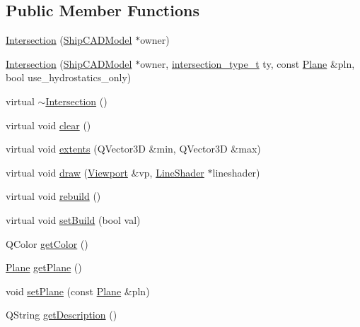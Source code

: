 \subsection*{Public Member Functions}
\begin{DoxyCompactItemize}
\item 
\hyperlink{classShipCAD_1_1Intersection_acde7d35483e1e4ee56ecf75eb7a70f66}{Intersection} (\hyperlink{classShipCAD_1_1ShipCADModel}{Ship\-C\-A\-D\-Model} $\ast$owner)
\item 
\hyperlink{classShipCAD_1_1Intersection_a3a4f17fe81289d26d2ec329dd9db5c69}{Intersection} (\hyperlink{classShipCAD_1_1ShipCADModel}{Ship\-C\-A\-D\-Model} $\ast$owner, \hyperlink{namespaceShipCAD_aa56834b730aafdf2786ddc9a60a046fd}{intersection\-\_\-type\-\_\-t} ty, const \hyperlink{classShipCAD_1_1Plane}{Plane} \&pln, bool use\-\_\-hydrostatics\-\_\-only)
\item 
virtual \hyperlink{classShipCAD_1_1Intersection_a064951a970ed8dd11081b2903ab62122}{$\sim$\-Intersection} ()
\item 
virtual void \hyperlink{classShipCAD_1_1Intersection_a2163245dc7153d1590811ab2902d6ee4}{clear} ()
\item 
virtual void \hyperlink{classShipCAD_1_1Intersection_af751d515708531ca098321840a92c47b}{extents} (Q\-Vector3\-D \&min, Q\-Vector3\-D \&max)
\item 
virtual void \hyperlink{classShipCAD_1_1Intersection_a9e346019a52aa0540628b75994ea94a5}{draw} (\hyperlink{classShipCAD_1_1Viewport}{Viewport} \&vp, \hyperlink{classShipCAD_1_1LineShader}{Line\-Shader} $\ast$lineshader)
\item 
virtual void \hyperlink{classShipCAD_1_1Intersection_aed30bdca43037f72b85c4d53e234fd6c}{rebuild} ()
\item 
virtual void \hyperlink{classShipCAD_1_1Intersection_a2b496f9ab21c5fc4a7b97a665b24f2b1}{set\-Build} (bool val)
\item 
Q\-Color \hyperlink{classShipCAD_1_1Intersection_acae07360e9ccef12a498332ac6dbedd9}{get\-Color} ()
\item 
\hyperlink{classShipCAD_1_1Plane}{Plane} \hyperlink{classShipCAD_1_1Intersection_ac0b838a811f8df5c2fa0b0ea44ba4bb7}{get\-Plane} ()
\item 
void \hyperlink{classShipCAD_1_1Intersection_a582c3dcbe3016c554b6bba094e2854ce}{set\-Plane} (const \hyperlink{classShipCAD_1_1Plane}{Plane} \&pln)
\item 
Q\-String \hyperlink{classShipCAD_1_1Intersection_ab0434113cfd34c8a3ab11f75976dbf5b}{get\-Description} ()

\end{DoxyCompactItemize}
